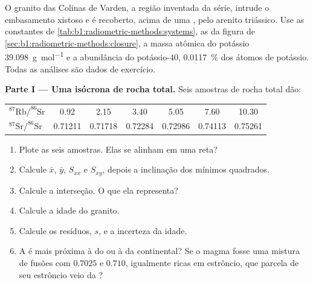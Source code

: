 \begin{problem}
\label{pb:b1:radiometric-methods:1}
O granito das Colinas de Varden, a região inventada da série, intrude o embasamento xistoso e é
recoberto, acima de uma , pelo arenito triássico. Use as constantes de
\cref{tab:b1:radiometric-methods:systems}, as  da figura de
\cref{sec:b1:radiometric-methods:closure}, a massa atômica do potássio \qty{39.098}{g.mol^{-1}} e
a abundância do potássio-40, \qty{0.0117}{\percent} dos átomos de potássio. Todas as análises são
dados de exercício.

\medskip
\noindent\textbf{Parte I --- Uma isócrona de rocha total.} Seis amostras de rocha total dão:
\begin{center}
\small
\begin{tabular}{|l|cccccc|}
\hline
$^{87}\mathrm{Rb}/^{86}\mathrm{Sr}$ & 0.92 & 2.15 & 3.40 & 5.05 & 7.60 & 10.30 \\
$^{87}\mathrm{Sr}/^{86}\mathrm{Sr}$ & 0.71211 & 0.71718 & 0.72284 & 0.72986 & 0.74113 & 0.75261 \\
\hline
\end{tabular}
\end{center}
\begin{enumerate}
  \item Plote as seis amostras. Elas se alinham em uma reta?
  \item Calcule $\bar x$, $\bar y$, $S_{xx}$ e $S_{xy}$, depois a
        inclinação dos mínimos quadrados.
  \item Calcule a interseção. O que ela representa?
  \item Calcule a idade do granito.
  \item Calcule os resíduos, $s$, e a incerteza da idade.
  \item A  é mais próxima à do  ou à da  continental? Se o magma fosse
        uma mistura de fusões com $0.7025$ e $0.710$, igualmente ricas em estrôncio, que parcela
        de seu estrôncio veio da ?
\end{enumerate}


\end{problem}
